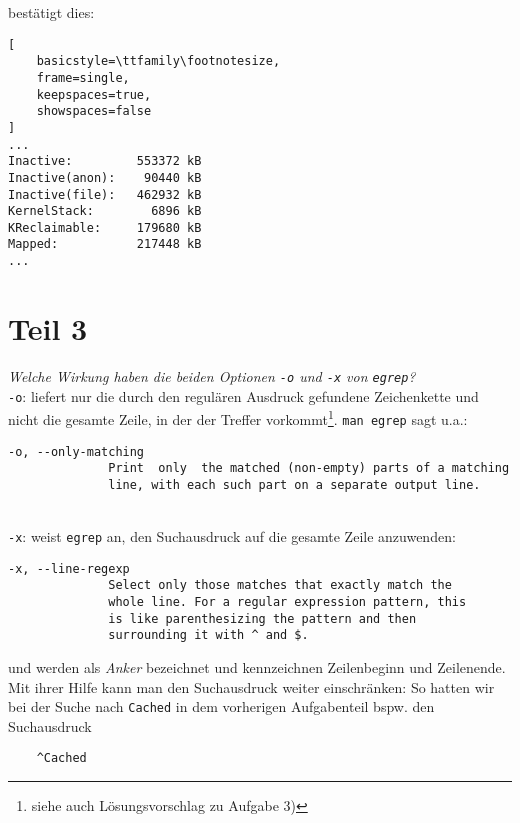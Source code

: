 \noindent
bestätigt dies:

\begin{lstlisting}[
    basicstyle=\ttfamily\footnotesize,
    frame=single,
    keepspaces=true,
    showspaces=false
]
...
Inactive:         553372 kB
Inactive(anon):    90440 kB
Inactive(file):   462932 kB
KernelStack:        6896 kB
KReclaimable:     179680 kB
Mapped:           217448 kB
...
\end{lstlisting}


\section{Teil 3}

\textit{Welche Wirkung haben die beiden Optionen \texttt{-o} und \texttt{-x} von \texttt{egrep}?}\\

\noindent
\texttt{-o}: liefert nur die durch den regulären Ausdruck gefundene Zeichenkette und nicht die gesamte Zeile, in der der Treffer vorkommt\footnote{
siehe auch Lösungsvorschlag zu Aufgabe 3)
}. \texttt{man egrep} sagt u.a.:

\begin{verbatim}
-o, --only-matching
              Print  only  the matched (non-empty) parts of a matching
              line, with each such part on a separate output line.
\end{verbatim}

\\

\noindent
\texttt{-x}: weist \texttt{egrep} an, den Suchausdruck auf die gesamte Zeile anzuwenden:\\

\begin{verbatim}
-x, --line-regexp
              Select only those matches that exactly match the
              whole line. For a regular expression pattern, this
              is like parenthesizing the pattern and then
              surrounding it with ^ and $.
\end{verbatim}

\noindent
\code{^} und \code{$} werden als \textit{Anker} bezeichnet und kennzeichnen Zeilenbeginn und Zeilenende.
Mit ihrer Hilfe kann man den Suchausdruck weiter einschränken:
So hatten wir bei der Suche nach \texttt{Cached} in dem vorherigen Aufgabenteil bspw. den Suchausdruck

\begin{verbatim}
    ^Cached
\end{verbatim}

